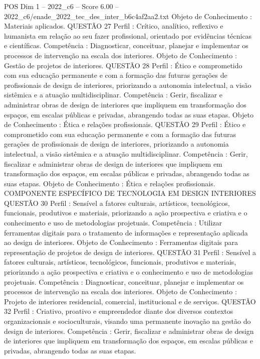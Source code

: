 \begin{textsample}{POS Dim 1 – 2022\_c6 – Score 6.00 – 2022\_c6/enade\_2022\_tec\_des\_inter\_b6c4af2aa2.txt}
Objeto de Conhecimento : Materiais aplicados.
QUESTÃO 27 Perfil : Crítico, analítico, reflexivo e humanista em relação ao seu fazer profissional, orientado por evidências técnicas e científicas.
Competência : Diagnosticar, conceituar, planejar e implementar os processos de intervenção na escala dos interiores.
Objeto de Conhecimento : Gestão de projetos de interiores.
QUESTÃO 28 Perfil : Ético e comprometido com sua educação permanente e com a formação das futuras gerações de profissionais de design de interiores, priorizando a autonomia intelectual, a visão sistêmica e a atuação multidisciplinar.
Competência : Gerir, fiscalizar e administrar obras de design de interiores que impliquem em transformação dos espaços, em escalas públicas e privadas, abrangendo todas as suas etapas.
Objeto de Conhecimento : Ética e relações profissionais.
QUESTÃO 29 Perfil : Ético e comprometido com sua educação permanente e com a formação das futuras gerações de profissionais de design de interiores, priorizando a autonomia intelectual, a visão sistêmica e a atuação multidisciplinar.
Competência : Gerir, fiscalizar e administrar obras de design de interiores que impliquem em transformação dos espaços, em escalas públicas e privadas, abrangendo todas as suas etapas.
Objeto de Conhecimento : Ética e relações profissionais.
COMPONENTE ESPECÍFICO DE TECNOLOGIA EM DESIGN INTERIORES QUESTÃO 30 Perfil : Sensível a fatores culturais, artísticos, tecnológicos, funcionais, produtivos e materiais, priorizando a ação prospectiva e criativa e o conhecimento e uso de metodologias projetuais.
Competência : Utilizar ferramentas digitais para o tratamento de informações e representação aplicada ao design de interiores.
Objeto de Conhecimento : Ferramentas digitais para representação de projetos de design de interiores.
QUESTÃO 31 Perfil : Sensível a fatores culturais, artísticos, tecnológicos, funcionais, produtivos e materiais, priorizando a ação prospectiva e criativa e o conhecimento e uso de metodologias projetuais.
Competência : Diagnosticar, conceituar, planejar e implementar os processos de intervenção na escala dos interiores.
Objeto de Conhecimento : Projeto de interiores residencial, comercial, institucional e de serviços.
QUESTÃO 32 Perfil : Criativo, proativo e empreendedor diante dos diversos contextos organizacionais e socioculturais, visando uma permanente inovação na gestão do design de interiores.
Competência : Gerir, fiscalizar e administrar obras de design de interiores que impliquem em transformação dos espaços, em escalas públicas e privadas, abrangendo todas as suas etapas.

\end{textsample}
